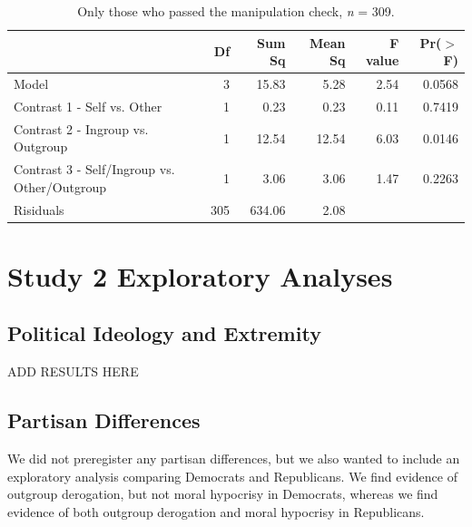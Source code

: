 \documentclass[12pt,]{article}
\begin{document}
\vspace{0.6cm}

\begin{table}[ht]
\centering
\begin{tabular}{lrrrrr}
  \hline
 & Df & Sum Sq & Mean Sq & F value & Pr($>$F) \\ 
  \hline
Model & 3 & 15.83 & 5.28 & 2.54 & 0.0568 \\ 
  Contrast 1 - Self vs. Other & 1 & 0.23 & 0.23 & 0.11 & 0.7419 \\ 
  Contrast 2 - Ingroup vs. Outgroup & 1 & 12.54 & 12.54 & 6.03 & 0.0146 \\ 
  Contrast 3 - Self/Ingroup vs. Other/Outgroup & 1 & 3.06 & 3.06 & 1.47 & 0.2263 \\ 
  Risiduals & 305 & 634.06 & 2.08 &  &  \\ 
   \hline
\end{tabular}
\caption{Only those who passed the manipulation check, \emph{n} = 309.} 
\label{manip2}
\end{table}



\clearpage
\section{Study 2 Exploratory Analyses}
\label{appendix:explore2}



\subsection{Political Ideology and Extremity}
\label{appendix:ideo_extrem2}

ADD RESULTS HERE 


\clearpage
\subsection{Partisan Differences}
\label{appendix:p_dif2}

We did not preregister any partisan differences, but we also wanted to include an exploratory analysis comparing Democrats and Republicans.  We find evidence of outgroup derogation, but not moral hypocrisy in Democrats, whereas we find evidence of both outgroup derogation and moral hypocrisy in Republicans. 
\end{document}
